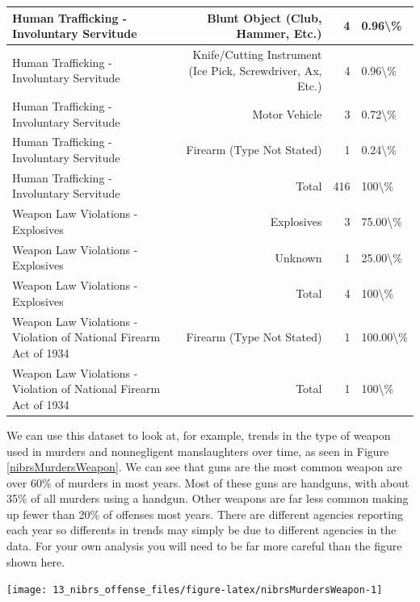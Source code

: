 \documentclass[
]{krantz}
\let\origfigure\figure
\let\endorigfigure\endfigure
\renewenvironment{figure}[1][2] {
    \expandafter\origfigure\expandafter[H]
} {
    \endorigfigure
}
\begin{document}
\begin{longtable}[t]{l|r|r|l}
\hline
Human Trafficking - Involuntary Servitude & Blunt Object (Club, Hammer, Etc.) & 4 & 0.96\textbackslash{}\%\\
\hline
Human Trafficking - Involuntary Servitude & Knife/Cutting Instrument (Ice Pick, Screwdriver, Ax, Etc.) & 4 & 0.96\textbackslash{}\%\\
\hline
Human Trafficking - Involuntary Servitude & Motor Vehicle & 3 & 0.72\textbackslash{}\%\\
\hline
Human Trafficking - Involuntary Servitude & Firearm (Type Not Stated) & 1 & 0.24\textbackslash{}\%\\
\hline
Human Trafficking - Involuntary Servitude & Total & 416 & 100\textbackslash{}\%\\
\hline
Weapon Law Violations - Explosives & Explosives & 3 & 75.00\textbackslash{}\%\\
\hline
Weapon Law Violations - Explosives & Unknown & 1 & 25.00\textbackslash{}\%\\
\hline
Weapon Law Violations - Explosives & Total & 4 & 100\textbackslash{}\%\\
\hline
Weapon Law Violations - Violation of National Firearm Act of 1934 & Firearm (Type Not Stated) & 1 & 100.00\textbackslash{}\%\\
\hline
Weapon Law Violations - Violation of National Firearm Act of 1934 & Total & 1 & 100\textbackslash{}\%\\
\hline
\end{longtable}

We can use this dataset to look at, for example, trends in
the type of weapon used in murders and nonnegligent
manslaughters over time, as seen in Figure
\ref{nibrsMurdersWeapon}. We can see that guns are the most
common weapon are over 60\% of murders in most years. Most
of these guns are handguns, with about 35\% of all murders
using a handgun. Other weapons are far less common making up
fewer than 20\% of offenses most years. There are different
agencies reporting each year so differents in trends may
simply be due to different agencies in the data. For your
own analysis you will need to be far more careful than the
figure shown here.

\begin{figure}

{\centering \texttt{[image: 13\_nibrs\_offense\_files/figure-latex/nibrsMurdersWeapon-1]} 

}

\caption{The annual percent of murders and nonnegligent homicides, by offender weapon, 1991-2022.}\label{fig:nibrsMurdersWeapon}
\end{figure}
\end{document}
